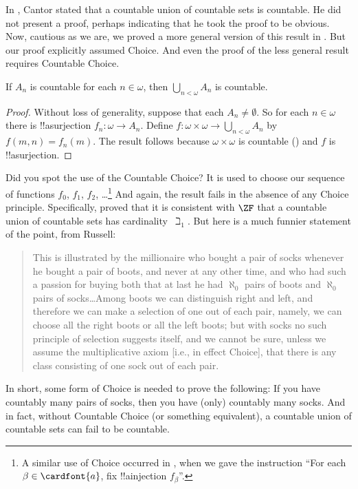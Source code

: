 \documentclass[../../../include/open-logic-section]{subfiles}
\begin{document}
\begin{ex} 
In \cite{Cantor1878}, Cantor stated that a countable union of
countable sets is countable. He did not present a proof, perhaps
indicating that he took the proof to be obvious. Now, cautious as we
are, we proved a more general version of this result in
.  But our proof
explicitly assumed Choice. And even the proof of the less general
result requires Countable Choice.

\begin{thm}
If $A_n$ is countable for each $n \in \omega$, then $\bigcup_{n <
\omega} A_n$ is countable.
\end{thm}

\begin{proof}
Without loss of generality, suppose that each $A_n \neq \emptyset$. So
for each $n \in \omega$ there is !!a{surjection} $f_n \colon \omega
\to A_n$. Define $f \colon \omega \times \omega \to \bigcup_{n <
\omega} A_n$ by $f(m, n) = f_n(m)$. The result follows because $\omega
\times \omega$ is countable
() and $f$ is
!!a{surjection}.
\end{proof}
\noindent 
Did you spot the use of the Countable Choice? It is used to choose our
sequence of functions $f_0$, $f_1$, $f_2$, \dots\footnote{A similar
use of Choice occurred in
, when we gave the
instruction ``For each $\beta \in \cardfont{a}$, fix !!a{injection}
$f_\beta$''.} And again, the result fails in the absence of any Choice
principle. Specifically, \cite{FefermanLevy1963} proved that it is
consistent with $\ZF$ that a countable union of countable sets has
cardinality~$\beth_1$. But here is a much funnier statement of the
point, from Russell:
\begin{quote}
  This is illustrated by the millionaire who bought a pair of socks
  whenever he bought a pair of boots, and never at any other time, and
  who had such a passion for buying both that at last he had
  $\aleph_0$ pairs of boots and $\aleph_0$ pairs of socks\dots\@ Among
  boots we can distinguish right and left, and therefore we can make a
  selection of one out of each pair, namely, we can choose all the
  right boots or all the left boots; but with socks no such principle
  of selection suggests itself, and we cannot be sure, unless we
  assume the multiplicative axiom [i.e., in effect Choice], that there
  is any class consisting of one sock out of each pair.
  \cite[p.~126]{Russell1919}
\end{quote}
In short, some form of Choice is needed to prove the following: If you
have countably many pairs of socks, then you have (only) countably
many socks. And in fact, without Countable Choice (or something
equivalent), a countable union of countable sets can fail to be
countable. 
\end{ex}
\end{document}
